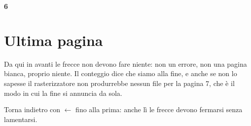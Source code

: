 \documentclass[12pt,a4paper]{article}
\newcommand{\numerone}[1]{%
  {\centering\fontsize{90}{90}\selectfont\bfseries\textcolor{gray!30}{#1}\par}%
  \vspace{0.5em}%
}
\begin{document}
\vspace{1em}
\noindent{}
\newpage

\numerone{6}
\section{Ultima pagina}
Da qui in avanti le frecce non devono fare niente: non un errore, non una pagina
bianca, proprio niente. Il conteggio dice che siamo alla fine, e anche se non lo
sapesse il rasterizzatore non produrrebbe nessun file per la pagina 7, che è il
modo in cui la fine si annuncia da sola.

\vspace{2em}
\noindent Torna indietro con $\leftarrow$ fino alla prima: anche lì le frecce
devono fermarsi senza lamentarsi.
\end{document}
